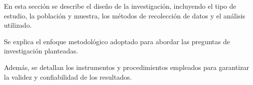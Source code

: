 \label{sec:metodologia}

En esta sección se describe el diseño de la investigación, incluyendo el tipo de estudio, la población y muestra, los métodos de recolección de datos y el análisis utilizado.

Se explica el enfoque metodológico adoptado para abordar las preguntas de investigación planteadas.

Además, se detallan los instrumentos y procedimientos empleados para garantizar la validez y confiabilidad de los resultados.